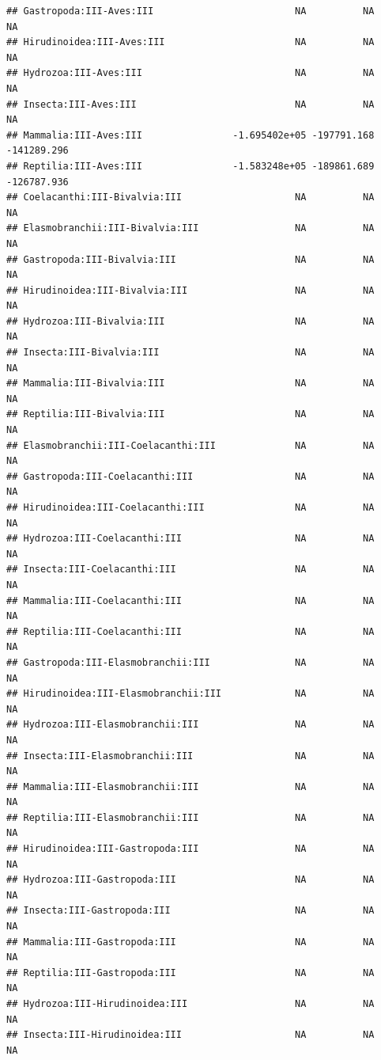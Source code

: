 \documentclass[
  12pt,
]{article}
\begin{document}
\begin{verbatim}
## Gastropoda:III-Aves:III                         NA          NA          NA
## Hirudinoidea:III-Aves:III                       NA          NA          NA
## Hydrozoa:III-Aves:III                           NA          NA          NA
## Insecta:III-Aves:III                            NA          NA          NA
## Mammalia:III-Aves:III                -1.695402e+05 -197791.168 -141289.296
## Reptilia:III-Aves:III                -1.583248e+05 -189861.689 -126787.936
## Coelacanthi:III-Bivalvia:III                    NA          NA          NA
## Elasmobranchii:III-Bivalvia:III                 NA          NA          NA
## Gastropoda:III-Bivalvia:III                     NA          NA          NA
## Hirudinoidea:III-Bivalvia:III                   NA          NA          NA
## Hydrozoa:III-Bivalvia:III                       NA          NA          NA
## Insecta:III-Bivalvia:III                        NA          NA          NA
## Mammalia:III-Bivalvia:III                       NA          NA          NA
## Reptilia:III-Bivalvia:III                       NA          NA          NA
## Elasmobranchii:III-Coelacanthi:III              NA          NA          NA
## Gastropoda:III-Coelacanthi:III                  NA          NA          NA
## Hirudinoidea:III-Coelacanthi:III                NA          NA          NA
## Hydrozoa:III-Coelacanthi:III                    NA          NA          NA
## Insecta:III-Coelacanthi:III                     NA          NA          NA
## Mammalia:III-Coelacanthi:III                    NA          NA          NA
## Reptilia:III-Coelacanthi:III                    NA          NA          NA
## Gastropoda:III-Elasmobranchii:III               NA          NA          NA
## Hirudinoidea:III-Elasmobranchii:III             NA          NA          NA
## Hydrozoa:III-Elasmobranchii:III                 NA          NA          NA
## Insecta:III-Elasmobranchii:III                  NA          NA          NA
## Mammalia:III-Elasmobranchii:III                 NA          NA          NA
## Reptilia:III-Elasmobranchii:III                 NA          NA          NA
## Hirudinoidea:III-Gastropoda:III                 NA          NA          NA
## Hydrozoa:III-Gastropoda:III                     NA          NA          NA
## Insecta:III-Gastropoda:III                      NA          NA          NA
## Mammalia:III-Gastropoda:III                     NA          NA          NA
## Reptilia:III-Gastropoda:III                     NA          NA          NA
## Hydrozoa:III-Hirudinoidea:III                   NA          NA          NA
## Insecta:III-Hirudinoidea:III                    NA          NA          NA

\end{verbatim}
\end{document}
